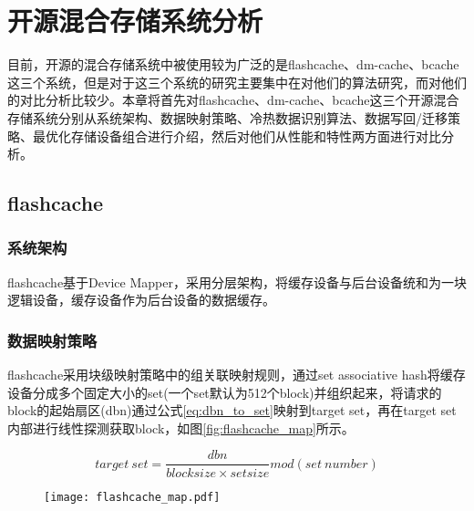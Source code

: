 
\chapter{开源混合存储系统分析}
\label{chap:opensource_intro}

目前，开源的混合存储系统中被使用较为广泛的是flashcache、dm-cache、bcache这三个系统，但是对于这三个系统的研究主要集中在对他们的算法研究\cite{杨宗2013flashcache, 唐华敏2015bcache}，而对他们的对比分析比较少。本章将首先对flashcache、dm-cache、bcache这三个开源混合存储系统分别从系统架构、数据映射策略、冷热数据识别算法、数据写回/迁移策略、最优化存储设备组合进行介绍，然后对他们从性能和特性两方面进行对比分析。

\section{flashcache}

\subsection{系统架构}

flashcache基于Device Mapper，采用分层架构，将缓存设备与后台设备统和为一块逻辑设备，缓存设备作为后台设备的数据缓存\cite{kgil2006flashcache}。

\subsection{数据映射策略}
\label{sec:flashcache_mapping}
flashcache采用块级映射策略中的组关联映射规则，通过set associative hash\cite{kimmel2014set}将缓存设备分成多个固定大小的set(一个set默认为512个block)并组织起来，将请求的block的起始扇区(dbn)通过公式\ref{eq:dbn_to_set}映射到target set，再在target set内部进行线性探测获取block，如图\ref{fig:flashcache_map}所示。

\begin{equation}
    \label{eq:dbn_to_set}
    target \ set = \frac{dbn}{block size \times set size} mod (set \  number)
\end{equation}

\begin{figure}[!htp]
    \centering
    \texttt{[image: flashcache\_map.pdf]}
\end{figure}


